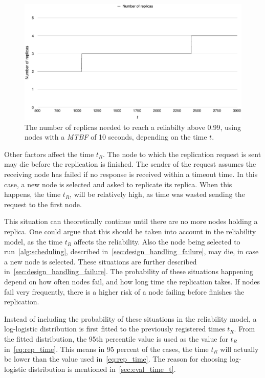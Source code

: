 \documentclass{cslthse-msc}
\begin{document}
\begin{figure}[!hbt]
\centering
\includegraphics[scale=0.5]{images/replicas_depending_on_t.pdf}
\caption[Number of replicas needed]{The number of replicas needed to reach a reliabilty above 0.99, using nodes with a \emph{MTBF} of 10 seconds, depending on the time $t$.}\label{fig:replicas_depending_on_t}
\end{figure}

Other factors affect the time $t_R$. The node to which the replication request is sent may die before the replication is finished. The sender of the request assumes the receiving node has failed if no response is received within a timeout time. In this case, a new node is selected and asked to replicate its replica. When this happens, the time $t_R$, will be relatively high, as time was wasted sending the request to the first node.

This situation can theoretically continue until there are no more nodes holding a replica. One could argue that this should be taken into account in the reliability model, as the time $t_R$ affects the reliability. Also the node being selected to run~\cref{alg:scheduling}, described in~\cref{sec:design_handling_failure}, may die, in case a new node is selected. These situations are further described in~\cref{sec:design_handling_failure}. The probability of these situations happening depend on how often nodes fail, and how long time the replication takes. If nodes fail very frequently, there is a higher risk of a node failing before finishes the replication.

Instead of including the probability of these situations in the reliability model, a log-logistic distribution is first fitted to the previously registered times $t_R$. From the fitted distribution, the 95th percentile value is used as the value for $t_R$ in~\cref{eq:rep_time}. This means in 95 percent of the cases, the time $t_R$ will actually be lower than the value used in~\cref{eq:rep_time}. The reason for choosing log-logistic distribution is mentioned in~\cref{sec:eval_time_t}.
\end{document}
